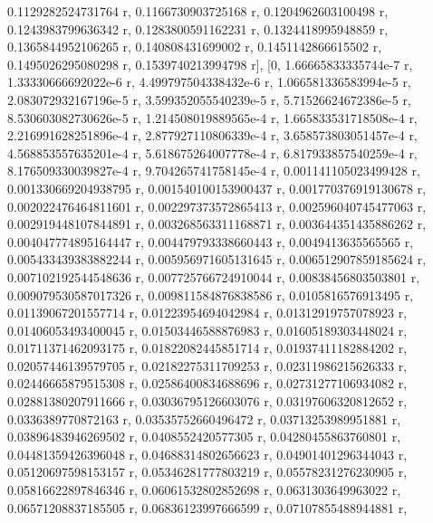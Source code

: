 \documentclass[a4paper,10pt]{article}
\begin{document}
\begin{eulernotebook}
\begin{eulercomment}
\begin{eulercomment}
\begin{eulercomment}
\begin{eulercomment}
\begin{eulercomment}
\begin{eulercomment}
\begin{eulercomment}
\begin{eulercomment}
\begin{eulercomment}
\begin{eulercomment}
\begin{eulercomment}
\begin{eulercomment}
\begin{eulercomment}
\begin{eulercomment}
\begin{eulercomment}
\begin{eulercomment}
\begin{eulercomment}
\begin{eulercomment}
\begin{eulercomment}
\begin{eulercomment}
\begin{eulercomment}
\begin{eulercomment}
\begin{eulercomment}
\begin{eulercomment}
\begin{eulercomment}
\begin{eulercomment}
\begin{eulercomment}
\begin{eulercomment}
\begin{euleroutput}
  0.1129282524731764 r, 0.1166730903725168 r, 0.1204962603100498 r, 
  0.1243983799636342 r, 0.1283800591162231 r, 0.1324418995948859 r, 
  0.1365844952106265 r, 0.140808431699002 r, 0.1451142866615502 r, 
  0.1495026295080298 r, 0.1539740213994798 r], 
  [0, 1.66665833335744e-7 r, 1.33330666692022e-6 r, 
  4.499797504338432e-6 r, 1.066581336583994e-5 r, 
  2.083072932167196e-5 r, 3.599352055540239e-5 r, 
  5.71526624672386e-5 r, 8.530603082730626e-5 r, 
  1.214508019889565e-4 r, 1.665833531718508e-4 r, 
  2.216991628251896e-4 r, 2.877927110806339e-4 r, 
  3.658573803051457e-4 r, 4.568853557635201e-4 r, 
  5.618675264007778e-4 r, 6.817933857540259e-4 r, 
  8.176509330039827e-4 r, 9.704265741758145e-4 r, 
  0.001141105023499428 r, 0.001330669204938795 r, 
  0.001540100153900437 r, 0.001770376919130678 r, 
  0.002022476464811601 r, 0.002297373572865413 r, 
  0.002596040745477063 r, 0.002919448107844891 r, 
  0.003268563311168871 r, 0.003644351435886262 r, 
  0.004047774895164447 r, 0.004479793338660443 r, 0.0049413635565565 r, 
  0.005433439383882244 r, 0.005956971605131645 r, 
  0.006512907859185624 r, 0.007102192544548636 r, 
  0.007725766724910044 r, 0.00838456803503801 r, 
  0.009079530587017326 r, 0.009811584876838586 r, 0.0105816576913495 r, 
  0.01139067201557714 r, 0.01223954694042984 r, 0.01312919757078923 r, 
  0.01406053493400045 r, 0.01503446588876983 r, 0.01605189303448024 r, 
  0.01711371462093175 r, 0.01822082445851714 r, 0.01937411182884202 r, 
  0.02057446139579705 r, 0.02182275311709253 r, 0.02311986215626333 r, 
  0.02446665879515308 r, 0.02586400834688696 r, 0.02731277106934082 r, 
  0.02881380207911666 r, 0.03036795126603076 r, 0.03197606320812652 r, 
  0.0336389770872163 r, 0.03535752660496472 r, 0.03713253989951881 r, 
  0.03896483946269502 r, 0.0408552420577305 r, 0.04280455863760801 r, 
  0.04481359426396048 r, 0.04688314802656623 r, 0.04901401296344043 r, 
  0.05120697598153157 r, 0.05346281777803219 r, 0.05578231276230905 r, 
  0.05816622897846346 r, 0.06061532802852698 r, 0.0631303649963022 r, 
  0.06571208837185505 r, 0.06836123997666599 r, 0.07107855488944881 r, 

\end{euleroutput}
\end{eulercomment}
\end{eulercomment}
\end{eulercomment}
\end{eulercomment}
\end{eulercomment}
\end{eulercomment}
\end{eulercomment}
\end{eulercomment}
\end{eulercomment}
\end{eulercomment}
\end{eulercomment}
\end{eulercomment}
\end{eulercomment}
\end{eulercomment}
\end{eulercomment}
\end{eulercomment}
\end{eulercomment}
\end{eulercomment}
\end{eulercomment}
\end{eulercomment}
\end{eulercomment}
\end{eulercomment}
\end{eulercomment}
\end{eulercomment}
\end{eulercomment}
\end{eulercomment}
\end{eulercomment}
\end{eulercomment}
\end{eulernotebook}
\end{document}
